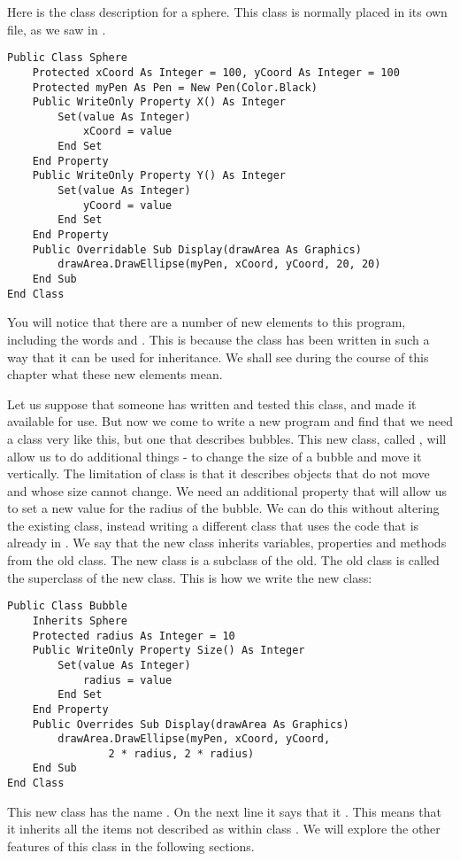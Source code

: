 		Here is the class description for a sphere. This class is normally placed in its own file, as we saw in .
		\begin{lstlisting}
Public Class Sphere
	Protected xCoord As Integer = 100, yCoord As Integer = 100
	Protected myPen As Pen = New Pen(Color.Black)
	Public WriteOnly Property X() As Integer
		Set(value As Integer)
			xCoord = value
		End Set
	End Property
	Public WriteOnly Property Y() As Integer
		Set(value As Integer)
			yCoord = value
		End Set
	End Property
	Public Overridable Sub Display(drawArea As Graphics) 					
		drawArea.DrawEllipse(myPen, xCoord, yCoord, 20, 20)
	End Sub
End Class
		\end{lstlisting}
		You will notice that there are a number of new elements to this program, including the words  and . This is because the class has been written in such a way that it can be used for inheritance. We shall see during the course of this chapter what these new elements mean.
		
		Let us suppose that someone has written and tested this class, and made it available for use. But now we come to write a new program and find that we need a class very like this, but one that describes bubbles. This new class, called , will allow us to do additional things - to change the size of a bubble and move it vertically. The limitation of class  is that it describes objects that do not move and whose size cannot change. We need an additional property that will allow us to set a new value for the radius of the bubble. We can do this without altering the existing class, instead writing a different class that uses the code that is already in . We say that the new class inherits variables, properties and methods from the old class. The new class is a subclass of the old. The old class is called the superclass of the new class. This is how we write the new class:
		\begin{lstlisting}
Public Class Bubble
	Inherits Sphere
	Protected radius As Integer = 10
	Public WriteOnly Property Size() As Integer
		Set(value As Integer)
			radius = value
		End Set
	End Property
	Public Overrides Sub Display(drawArea As Graphics)
		drawArea.DrawEllipse(myPen, xCoord, yCoord,
				2 * radius, 2 * radius)
	End Sub
End Class
		\end{lstlisting}
		This new class has the name . On the next line it says that it . This means that it inherits all the items not described as  within class . We will explore the other features of this class in the following sections.


